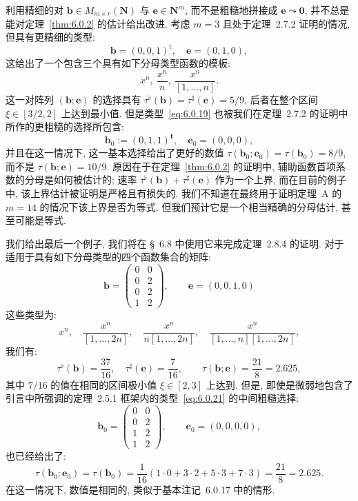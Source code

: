\begin{remark}\label{rem:6.0.18}
利用精细的对 $\mathbf{b} \in M_{m \times r}(\mathbf{N})$ 与 $\mathbf{e} \in \mathbf{N}^m$, 而不是粗糙地拼接成 $\mathbf{e} \leadsto \mathbf{0}$, 并不总是能对定理~\ref{thm:6.0.2} 的估计给出改进.
考虑 $m=3$ 且处于定理~2.7.2 证明的情况, 但具有更精细的类型:
\[ \mathbf{b} = (0, 0, 1)^{\mathrm{t}}, \quad \mathbf{e} = (0, 1, 0), \]
这给出了一个包含三个具有如下分母类型函数的模板:
\begin{equation}\label{eq:6.0.19}
x^n, \ \frac{x^n}{n}, \ \frac{x^n}{[1, \dots, n]}.
\end{equation}
这一对阵列 $(\mathbf{b}; \mathbf{e})$ 的选择具有 $\tau^{\flat}(\mathbf{b}) = \tau^{\sharp}(\mathbf{e}) = 5/9$, 后者在整个区间 $\xi \in [3/2, 2]$ 上达到最小值.
但是类型~\eqref{eq:6.0.19} 也被我们在定理~2.7.2 的证明中所作的更粗糙的选择所包含:
\[ \mathbf{b}_0 := (0, 1, 1)^{\mathbf{t}}, \quad \mathbf{e}_0 = (0, 0, 0), \]
并且在这一情况下, 这一基本选择给出了更好的数值 $\tau(\mathbf{b}_0; \mathbf{e}_0) = \tau(\mathbf{b}_0) = 8/9$, 而不是 $\tau(\mathbf{b}; \mathbf{e}) = 10/9$.
原因在于在定理~\ref{thm:6.0.2} 的证明中, 辅助函数首项系数的分母是如何被估计的; 速率 $\tau^{\flat}(\mathbf{b}) + \tau^{\sharp}(\mathbf{e})$ 作为一个上界, 而在目前的例子中, 该上界估计被证明是严格且有损失的.
我们不知道在最终用于证明定理~A 的 $m = 14$ 的情况下该上界是否为等式, 但我们预计它是一个相当精确的分母估计, 甚至可能是等式. \end{remark}

\begin{example}\label{exa:6.0.20}
我们给出最后一个例子, 我们将在 \S~6.8 中使用它来完成定理~2.8.4 的证明.
对于适用于具有如下分母类型的四个函数集合的矩阵:
\[ \mathbf{b} = \begin{pmatrix} 0 & 0 \\ 0 & 2 \\ 0 & 2 \\ 1 & 2 \end{pmatrix}, \qquad \mathbf{e} = (0, 0, 1, 0) \]
这些类型为:
\begin{equation}\label{eq:6.0.21}
x^n, \quad \frac{x^n}{[1,\dots,2n]}, \quad \frac{x^n}{n[1,\dots,2n]}, \quad \frac{x^n}{[1,\dots,n][1,\dots,2n]},
\end{equation}
我们有:
\[ \tau^{\flat}(\mathbf{b}) = \frac{37}{16}, \quad \tau^{\sharp}(\mathbf{e}) = \frac{7}{16}, \qquad \tau(\mathbf{b}; \mathbf{e}) = \frac{21}{8} = 2.625, \]
其中 $7/16$ 的值在相同的区间极小值 $\xi \in [2, 3]$ 上达到.
但是, 即使是微弱地包含了引言中所强调的定理~2.5.1 框架内的类型~\eqref{eq:6.0.21} 的中间粗糙选择:
\[ \mathbf{b}_0 = \begin{pmatrix} 0 & 0 \\ 0 & 2 \\ 1 & 2 \\ 1 & 2 \end{pmatrix}, \qquad \mathbf{e}_0 = (0, 0, 0, 0), \]
也已经给出了:
\[ \tau(\mathbf{b}_0; \mathbf{e}_0) = \tau(\mathbf{b}_0) = \frac{1}{16} (1 \cdot 0 + 3 \cdot 2 + 5 \cdot 3 + 7 \cdot 3) = \frac{21}{8} = 2.625. \]
在这一情况下, 数值是相同的, 类似于基本注记~6.0.17 中的情形. \end{example}

